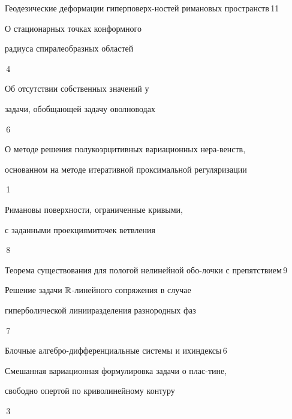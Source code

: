 

{Геодезические деформации гиперповерх-\newline ностей римановых пространств}{\No\,11}




{О стационарных точках конформного 


радиуса спиралеобразных областей}{\No\,4}




{Об отсутствии  собственных значений у


задачи, обобщающей задачу о\newline волноводах}{\No\,6}










{О методе решения полукоэрцитивных вариационных нера-\newline венств,


основанном на методе итеративной проксимальной регуляризации}{\No\,1}




{Римановы поверхности, ограниченные кривыми,


с заданными проекциями\newline точек ветвления}{\No\,8}




{Теорема существования для пологой нелинейной обо-\newline лочки с препятствием}{\No\,9}







{Решение задачи $\Bbb R$-линейного сопряжения в случае


гиперболической линии\newline разделения разнородных фаз}{\No\,7}




{Блочные алгебро-дифференциальные системы и их\newline индексы}{\No\,6}










{Смешанная вариационная формулировка задачи о плас-\newline тине, 


свободно опертой по криволинейному контуру}{\No\,3} 


